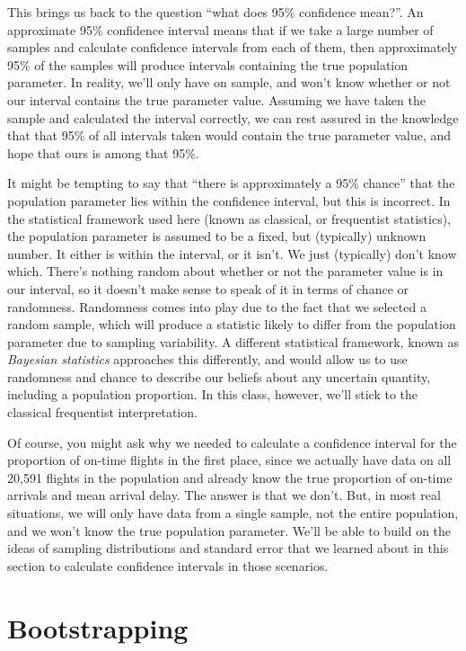 \documentclass[
  letterpaper,
  DIV=11,
  numbers=noendperiod]{scrreprt}
\begin{document}
This brings us back to the question ``what does 95\% confidence mean?''.
An approximate 95\% confidence interval means that if we take a large
number of samples and calculate confidence intervals from each of them,
then approximately 95\% of the samples will produce intervals containing
the true population parameter. In reality, we'll only have on sample,
and won't know whether or not our interval contains the true parameter
value. Assuming we have taken the sample and calculated the interval
correctly, we can rest assured in the knowledge that that 95\% of all
intervals taken would contain the true parameter value, and hope that
ours is among that 95\%.

It might be tempting to say that ``there is approximately a 95\%
chance'' that the population parameter lies within the confidence
interval, but this is incorrect. In the statistical framework used here
(known as classical, or frequentist statistics), the population
parameter is assumed to be a fixed, but (typically) unknown number. It
either is within the interval, or it isn't. We just (typically) don't
know which. There's nothing random about whether or not the parameter
value is in our interval, so it doesn't make sense to speak of it in
terms of chance or randomness. Randomness comes into play due to the
fact that we selected a random sample, which will produce a statistic
likely to differ from the population parameter due to sampling
variability. A different statistical framework, known as \emph{Bayesian
statistics} approaches this differently, and would allow us to use
randomness and chance to describe our beliefs about any uncertain
quantity, including a population proportion. In this class, however,
we'll stick to the classical frequentist interpretation.

Of course, you might ask why we needed to calculate a confidence
interval for the proportion of on-time flights in the first place, since
we actually have data on all 20,591 flights in the population and
already know the true proportion of on-time arrivals and mean arrival
delay. The answer is that we don't. But, in most real situations, we
will only have data from a single sample, not the entire population, and
we won't know the true population parameter. We'll be able to build on
the ideas of sampling distributions and standard error that we learned
about in this section to calculate confidence intervals in those
scenarios.

\section{Bootstrapping}\label{bootstrapping}
\end{document}
